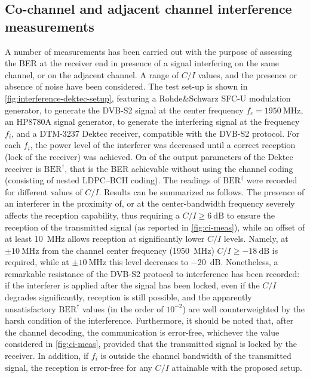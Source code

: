 \documentclass[conference,10pt,a4paper]{IEEEtran}%
\begin{document}
\subsection{Co-channel and adjacent channel interference measurements}
A number of measurements has been carried out with the purpose of assessing the BER at the receiver end in presence of a signal interfering on the same channel, or on the adjacent channel.
A range of $C/I$ values, and the presence or absence of noise have been considered.
The test set-up is shown in \cref{fig:interference-dektec-setup}, featuring a Rohde\&{}Schwarz SFC-U modulation generator, to generate the DVB-S2 signal at the center frequency $f_c = \SI{1950}{\MHz}$, an HP8780A signal generator, to generate the interfering signal at the frequency $f_i$, and a DTM-3237 Dektec receiver, compatible with the DVB-S2 protocol.
For each $f_i$, the power level of the interferer was decreased until a correct reception (lock of the receiver) was achieved.
On of the output parameters of the Dektec receiver is $\text{BER}^\dagger$, that is the BER achievable without using the channel coding (consisting of nested LDPC--BCH coding).
The readings of $\text{BER}^\dagger$ were recorded for different values of $C/I$.
Results can be summarized as follows.
The presence of an interferer in the proximity of, or at the center-bandwidth frequency severely affects the reception capability, thus requiring a $C/I \geqslant \SI{6}{\deci\bel}$ to ensure the reception of the transmitted signal (as reported in \cref{fig:ci-meas}), while an offset of at least \SI{10}{\mega\Hz} allows reception at significantly lower $C/I$ levels.
Namely, at $\pm\SI{10}{\MHz}$ from the channel center frequency (\SI{1950}{\MHz}) $C/I \geqslant \SI{-18}{\dB}$ is required, while at $\pm\SI{10}{\MHz}$ this level decreases to \SI{-20}{\dB}.
Nonetheless, a remarkable resistance of the DVB-S2 protocol to interference has been recorded: if the interferer is applied after the signal has been locked, even if the $C/I$ degrades significantly, reception is still possible, and the apparently unsatisfactory $\text{BER}^\dagger$ values (in the order of $10^{-2}$) are well counterweighted by the harsh condition of the interference.
Furthermore, it should be noted that, after the channel decoding, the communication is error-free, whichever the value considered in \cref{fig:ci-meas}, provided that the transmitted signal is locked by the receiver.
In addition, if $f_i$ is outside the channel bandwidth of the transmitted signal, the reception is error-free for any $C/I$ attainable with the proposed setup.
\end{document}
